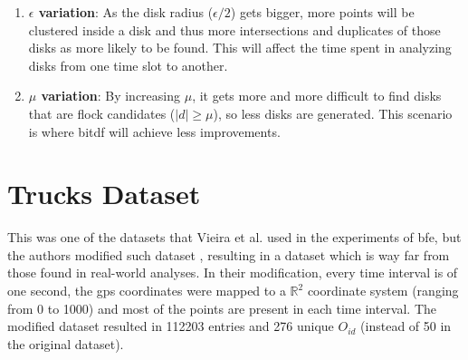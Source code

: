 {\begin{enumerate}
    \item \textbf{$\epsilon$ variation}: As the disk radius ($\epsilon / 2$) gets bigger, more points will be clustered
        inside a disk and thus more intersections and duplicates of those disks as more likely to be found. This will
        affect the time spent in analyzing disks from one time slot to another. \label{sssec:gvariation}

    \item \textbf{$\mu$ variation}: By increasing $\mu$, it gets more and more difficult to find disks that are flock
        candidates ($|d| \ge \mu$), so less disks are generated. This scenario is where \ac{bitdf} will achieve less
        improvements. \label{sssec:nvariation}
\end{enumerate}

\section{Trucks Dataset}
\label{sec:trucks}
This was one of the datasets that Vieira et al. \citep{vieira} used in the experiments of \ac{bfe}, but the authors
modified such dataset \citep{trucksdataset}, resulting in a dataset which is way far from those found in real-world
analyses. In their modification, every time interval is of one second, the \ac{gps} coordinates were mapped to a
$\mathbb{R}^2$ coordinate system (ranging from 0 to 1000) and most of the points are present in each time interval. The
modified dataset resulted in 112203 entries and 276 unique $O_{id}$ (instead of 50 in the original dataset).

}

